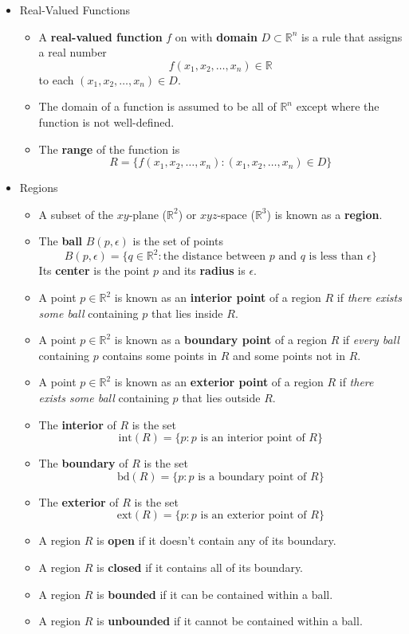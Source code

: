 \documentclass[12pt]{article}
\newcommand{\<}{\left<}
\renewcommand{\>}{\right>}
\begin{document}
  \begin{itemize}
  
    \item Real-Valued Functions
  
      \begin{itemize}
        \item A \textbf{real-valued function} $f$ on with \textbf{domain} $D \subset \mathbb{R}^n$ is a rule that assigns a real number \[f(x_1,x_2,\dots,x_n) \in \mathbb{R}\] to each $(x_1,x_2,\dots,x_n) \in D$.
        \item The domain of a function is assumed to be all of $\mathbb{R}^n$ except where the function is not well-defined.
        \item The \textbf{range} of the function is \[R = \{f(x_1,x_2,\dots,x_n) : (x_1,x_2,\dots,x_n) \in D\}\]
      \end{itemize}
    
    \item Regions
    
      \begin{itemize}
        \item A subset of the $xy$-plane ($\mathbb{R}^2$) or $xyz$-space ($\mathbb{R}^3$) is known as a \textbf{region}.
        \item The \textbf{ball} $B(p,\epsilon)$ is the set of points \[B(p,\epsilon) = \{q \in \mathbb{R}^2 : \text{the distance between }p\text{ and }q\text{ is less than }\epsilon\}\] Its \textbf{center} is the point $p$ and its \textbf{radius} is $\epsilon$.
        \item A point $p\in\mathbb{R}^2$ is known as an \textbf{interior point} of a region $R$ if \textit{there exists some ball} containing $p$ that lies inside $R$.
        \item A point $p\in\mathbb{R}^2$ is known as a \textbf{boundary point} of a region $R$ if \textit{every ball} containing $p$ contains some points in $R$ and some points not in $R$.
        \item A point $p\in\mathbb{R}^2$ is known as an \textbf{exterior point} of a region $R$ if \textit{there exists some ball} containing $p$ that lies outside $R$.
        \item The \textbf{interior} of $R$ is the set \[\textrm{int}(R)=\{p : p \text{ is an interior point of } R\}\]
        \item The \textbf{boundary} of $R$ is the set \[\textrm{bd}(R)=\{p : p \text{ is a boundary point of } R\}\]
        \item The \textbf{exterior} of $R$ is the set \[\textrm{ext}(R)=\{p : p \text{ is an exterior point of } R\}\]
        \item A region $R$ is \textbf{open} if it doesn't contain any of its boundary.
        \item A region $R$ is \textbf{closed} if it contains all of its boundary.
        \item A region $R$ is \textbf{bounded} if it can be contained within a ball.
        \item A region $R$ is \textbf{unbounded} if it cannot be contained within a ball.
      \end{itemize}


\end{itemize}
\end{document}
